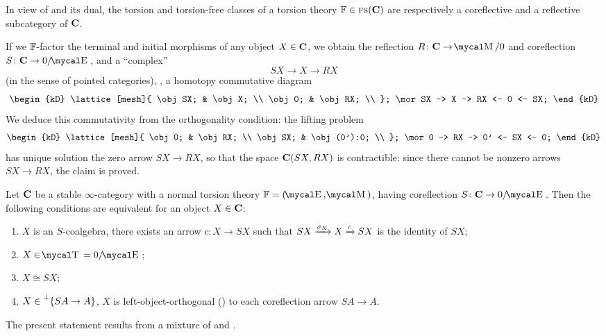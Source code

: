 \begin{remark}\label{only.zero}
In view of \aprop {} and its dual, the torsion and torsion\hyp{}free classes of a torsion theory $\mathbb{F}\in \textsc{fs}(\textbf{C})$ are respectively a coreflective and a reflective subcategory of $\textbf{C}$.

If we $\mathbb{F}$\hyp{}factor the terminal and initial morphisms of any object $X\in \textbf{C}$, we obtain the reflection $R\colon \CC\to \MM/0$ and coreflection $S\colon \CC \to 0/\EE$, and a ``complex'' 
\[\label{eqn:the.seq}
SX \to X \to RX
\]
(in the sense of pointed categories), \ie, a homotopy commutative diagram 
\[
\begin{kD}
\lattice[mesh]{
	\obj SX; & \obj X; \\
	\obj 0; & \obj RX; \\
};
\mor SX -> X -> RX <- 0 <- SX;
\end{kD}
\]
We deduce this commutativity from the orthogonality condition: the lifting problem
\[
\begin{kD}
\lattice[mesh]{
	\obj 0; & \obj RX; \\
	\obj SX; & \obj (0'):0; \\
};
\mor 0 -> RX -> 0' <- SX <- 0;
\end{kD}
\]
has unique solution the zero arrow $SX\to RX$, so that the space $\textbf{C}(SX, RX)$ is contractible: since there cannot be nonzero arrows $SX\to RX$, the claim is proved.
\end{remark}
\begin{proposition}\label{orthoreflex}
Let $\textbf{C}$ be a stable $\infty$\hyp{}category with a normal torsion theory $\fF= (\EE,\MM)$, having coreflection $S \colon \CC \to 0/\EE$. Then the following conditions are equivalent for an object $X\in\textbf{C}$: 
\begin{enumerate}
\item $X$ is an $S$\hyp{}coalgebra, \ie there exists an arrow $c\colon X \to SX$ such that $SX \xrightarrow{\sigma_X} X \xrightarrow{c} SX$ is the identity of $SX$;
\item $X\in \TT= 0/\EE$;
\item $X\cong SX$;
\item $X\in \prescript{\perp}{}{\{SA\to A\}}$, \ie $X$ is left\hyp{}object\hyp{}orthogonal (\adef {}) to each coreflection arrow $SA\to A$.
\end{enumerate} 
\end{proposition}
The present statement results from a mixture of \cite{RT} and \cite[Prop. 5.2]{kelly1980unified}.%

